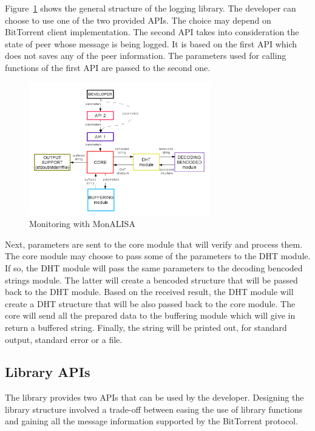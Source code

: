 Figure~\ref{fig:proto-measure:log-library-architecture} shows the general
structure of the logging library. The developer can choose to use one of the
two provided APIs. The choice may depend on BitTorrent client implementation.
The second API takes into consideration the state of peer whose message is
being logged. It is based on the first API which does not saves any of the
peer information. The parameters used for calling functions of the first API
are passed to the second one.

\begin{figure}[h]
  \begin{center}
    \includegraphics[width=0.7\textwidth]{src/img/proto-measure/log-library-architecture}
  \end{center}
  \caption{Monitoring with MonALISA}
  \label{fig:proto-measure:log-library-architecture}
\end{figure}

Next, parameters are sent to the core module that will verify and process
them. The core module may choose to pass some of the parameters to the DHT
module. If so, the DHT module will pass the same parameters to the decoding
bencoded strings module. The latter will create a bencoded structure that will
be passed back to the DHT module. Based on the received result, the DHT module
will create a DHT structure that will be also passed back to the core module.
The core will send all the prepared data to the buffering module which will
give in return a buffered string. Finally, the string will be printed out, for
standard output, standard error or a file.

\subsection{Library APIs}

The library provides two APIs that can be used by the developer. Designing the
library structure involved a trade-off between easing the use of library
functions and gaining all the message information supported by the BitTorrent
protocol.

